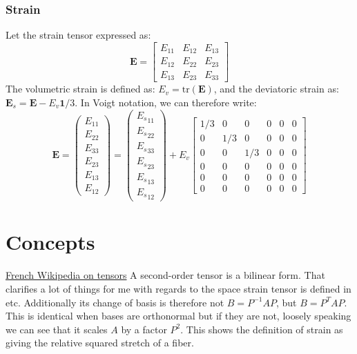 \documentclass[letterpaper,12pt,oneside]{report}
\begin{document}
\subsection{Strain}
Let the strain tensor expressed as:
\begin{equation}
\mathbf{E} = 
\left[\begin{array}{ccc}
E_{11} & E_{12} & E_{13} \\
E_{12} & E_{22} & E_{23} \\
E_{13} & E_{23} & E_{33}
\end{array}\right]
\end{equation}
The volumetric strain is defined as: $E_v = \mathrm{tr}(\mathbf{E})$, and the deviatoric strain as: $\mathbf{E}_s = \mathbf{E} - E_v \mathbf{1} /3$. In Voigt notation, we can therefore write:
\begin{equation}
\mathbf{E} = 
\left(\begin{array}{c}
E_{11} \\ E_{22} \\ E_{33} \\ E_{23} \\ E_{13} \\ E_{12}
\end{array}\right)
 = 
\left(\begin{array}{c}
{E_s}_{11} \\ {E_s}_{22} \\ {E_s}_{33} \\ {E_s}_{23} \\ {E_s}_{13} \\ {E_s}_{12}
\end{array}\right)
+ E_v
\left[\begin{array}{cccccc}
1/3 & 0 & 0 & 0 & 0 & 0 \\
0 & 1/3 & 0 & 0 & 0 & 0 \\
0 & 0 & 1/3 & 0 & 0 & 0 \\
0 & 0 & 0 & 0 & 0 & 0 \\
0 & 0 & 0 & 0 & 0 & 0 \\
0 & 0 & 0 & 0 & 0 & 0
\end{array}\right]
\end{equation}



\chapter{Concepts}

\href{https://fr.wikipedia.org/wiki/Tenseur}{French Wikipedia on tensors}
A second-order tensor is a bilinear form. That clarifies a lot of things for me with regards to the space strain tensor is defined in etc. Additionally its change of basis is therefore not $B=P^{-1}AP$, but $B=P^TAP$. This is identical when bases are orthonormal but if they are not, loosely speaking we can see that it scales $A$ by a factor $P^2$. This shows the definition of strain as giving the relative squared stretch of a fiber.
\end{document}
